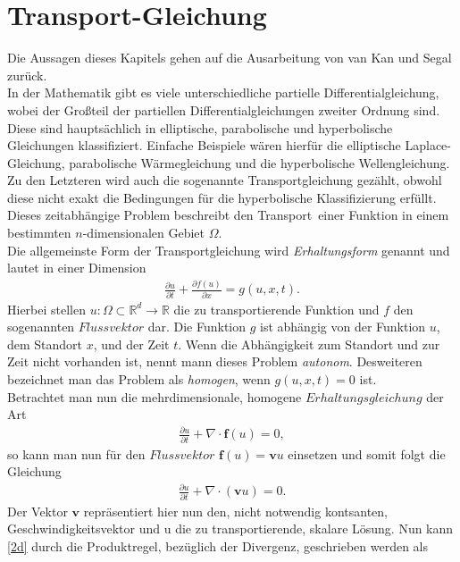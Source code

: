 \documentclass[12pt,titlepage]{article}
\begin{document}
\section{Transport-Gleichung}\label{sec:transglei}
Die Aussagen dieses Kapitels gehen auf die Ausarbeitung von van Kan und Segal \cite{segal2013numerik} zurück.\\
In der Mathematik gibt es viele unterschiedliche partielle Differentialgleichung, wobei der Großteil der partiellen Differentialgleichungen zweiter Ordnung sind. Diese sind hauptsächlich in elliptische, parabolische und hyperbolische Gleichungen klassifiziert. Einfache Beispiele wären hierfür die elliptische Laplace-Gleichung, parabolische Wärmegleichung und die hyperbolische Wellengleichung. Zu den Letzteren wird auch die sogenannte Transportgleichung gezählt, obwohl diese nicht exakt die Bedingungen für die hyperbolische Klassifizierung erfüllt. Dieses zeitabhängige Problem beschreibt den \grqq Transport\grqq~einer Funktion in einem bestimmten $n$-dimensionalen Gebiet $\Omega$.\\
Die allgemeinste Form der Transportgleichung wird \textit{Erhaltungsform} genannt und lautet in einer Dimension
\begin{align}
 \frac{\partial u}{\partial t}+\frac{\partial f(u)}{\partial x}=g(u,x,t)\label{1d}.
\end{align}
Hierbei stellen $u:\Omega\subset\mathbb{R}^d\to\mathbb{R}$ die zu transportierende Funktion und $f$ den sogenannten $Flussvektor$ dar. Die Funktion $g$ ist abhängig von der Funktion $u$, dem Standort $x$, und der Zeit $t$. Wenn die Abhängigkeit zum Standort und zur Zeit nicht vorhanden ist, nennt mann dieses Problem \textit{autonom}. Desweiteren bezeichnet man das Problem als \textit{homogen}, wenn $g(u,x,t)=0$ ist.\\
Betrachtet man nun die mehrdimensionale, homogene $Erhaltungsgleichung$ der Art
\begin{align}
 \frac{\partial u}{\partial t}+\nabla\cdot\textbf{f}(u)=0,
\end{align}
so kann man nun für den $Flussvektor$ $\textbf{f}(u)=\textbf{v} u$ einsetzen und somit folgt die Gleichung
\begin{align}
 \frac{\partial u}{\partial t}+\nabla \cdot (\textbf{v}u)=0.\label{2d}
\end{align}
Der Vektor $\textbf{v}$ repräsentiert hier nun den, nicht notwendig kontsanten, Geschwindigkeitsvektor und u die zu transportierende, skalare Lösung. Nun kann \eqref{2d} durch die Produktregel, bezüglich der Divergenz, geschrieben werden als
\end{document}
